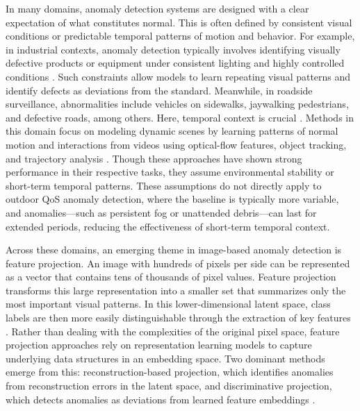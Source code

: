 \documentclass[remotesensing,article,submit,moreauthors]{Definitions/mdpi}
\begin{document}
In many domains, anomaly detection systems are designed with a clear expectation of what constitutes normal. This is often defined by consistent visual conditions or predictable temporal patterns of motion and behavior. For example, in industrial contexts, anomaly detection typically involves identifying visually defective products or equipment under consistent lighting and highly controlled conditions \cite{bergmann2019mvtec, tang2023reliable}. Such constraints allow models to learn repeating visual patterns and identify defects as deviations from the standard. Meanwhile, in roadside surveillance, abnormalities include vehicles on sidewalks, jaywalking pedestrians, and defective roads, among others. Here, temporal context is crucial \cite{ovhal2017analysis, rathee2023automated, santhosh2020anomaly, sultani2018real}. Methods in this domain focus on modeling dynamic scenes by learning patterns of normal motion and interactions from videos using optical-flow features, object tracking, and trajectory analysis \cite{santhosh2020anomaly}. Though these approaches have shown strong performance in their respective tasks, they assume environmental stability or short-term temporal patterns. These assumptions do not directly apply to outdoor \ac{QoS} anomaly detection, where the baseline is typically more variable, and anomalies—such as persistent fog or unattended debris—can last for extended periods, reducing the effectiveness of short-term temporal context. 

Across these domains, an emerging theme in image-based anomaly detection is feature projection. An image with hundreds of pixels per side can be represented as a vector that contains tens of thousands of pixel values. Feature projection transforms this large representation into a smaller set that summarizes only the most important visual patterns. In this lower-dimensional latent space, class labels are then more easily distinguishable through the extraction of key features \cite{olszewski2024dimensionality, sakurada2014anomaly, zong2018deep}. Rather than dealing with the complexities of the original pixel space, feature projection approaches rely on representation learning models to capture underlying data structures in an embedding space. Two dominant methods emerge from this: reconstruction-based projection, which identifies anomalies from reconstruction errors in the latent space, and discriminative projection, which detects anomalies as deviations from learned feature embeddings \cite{mishra2021vt}.
\end{document}
